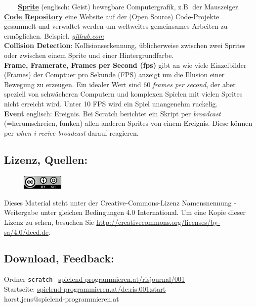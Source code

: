 \documentclass[10pt,a4paper,ngerman,twoside]{article} %
\begin{document}
\begin{multicols}{3}
~~~~\href{https://de.wikipedia.org/wiki/Sprite_(Computergrafik)}{\textbf{Sprite}} (englisch: Geist) bewegbare Computergrafik, z.B. der Mauszeiger.\\

\href{https://en.wikipedia.org/wiki/Source_code_repository}{\textbf{Code Repository}} eine Website auf der (Open Source) Code-Projekte gesammelt und verwaltet werden um weltweites gemeinsames Arbeiten zu ermöglichen. Beispiel. \href{http://github.com}{\textit{github.com}}\\

\textbf{Collision Detection}: Kollisionserkennung, üblicherweise zwischen zwei Sprites oder zwischen einem Sprite und einer Hintergrundfarbe. \\

\textbf{Frame, Framerate, Frames per Second (fps)} gibt an wie viele Einzelbilder (Frames) der Comptuer pro Sekunde (FPS) anzeigt um die Illusion einer Bewegung zu erzeugen. Ein idealer Wert sind 60 \textit{frames per second}, der aber speziell von schwächeren Computern und komplexen Spielen mit vielen Sprites nicht erreicht wird. Unter 10 FPS wird ein Spiel unangenehm ruckelig. \\

\textbf{Event} englisch: Ereignis. Bei Scratch berichtet ein Skript per \textit{broadcast} (=herumschreien, funken) allen anderen Sprites von einem Ereignis. Diese können per \textit{when i recive broadcast} darauf reagieren. \\


\subsection*{Lizenz, Quellen:}
\begin{figure}
\includegraphics[width=2cm]{powdertoytutorial/ccbysa88x31.png}
\end{figure}
Dieses Material steht unter der Creative-Commons-Lizenz Namensnennung - Weitergabe unter gleichen Bedingungen 4.0 International. Um eine Kopie dieser Lizenz zu sehen, besuchen Sie \url{http://creativecommons.org/licenses/by-sa/4.0/deed.de}.

\subsection*{Download, Feedback:}
\footnotesize{
Ordner \texttt{scratch} \Mundus\ \href{http://spielend-programmieren.at/risjournal/001}{spielend-programmieren.at/risjournal/001}\\
Startseite: \href{http://spielend-programmieren.at/de:ris:001:start}{spielend-programmieren.at/de:ris:001:start}\\ 
\Letter\:  horst.jens@spielend-programmieren.at \\}
\normalsize{}


\end{multicols}
\end{document}
